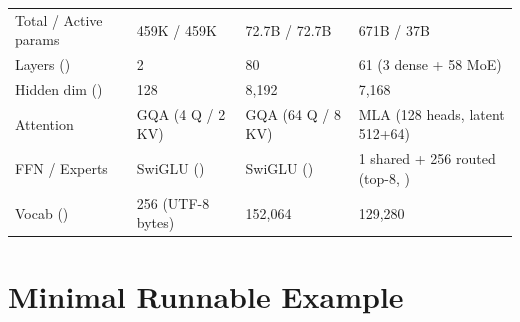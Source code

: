 \par\vspace{4pt}\noindent\begin{minipage}{\linewidth}
\small
\begin{tabularx}{\linewidth}{@{}l Y Y Y@{}}
\toprule
{} &  &  &  \\
\midrule
Total / Active params & 459K / 459K & 72.7B / 72.7B & 671B / 37B \\
Layers () & 2 & 80 & 61 (3 dense + 58 MoE) \\
Hidden dim () & 128 & 8,192 & 7,168 \\
Attention & GQA (4 Q / 2 KV) & GQA (64 Q / 8 KV) & MLA (128 heads, latent 512+64) \\
FFN / Experts & SwiGLU () & SwiGLU () & 1 shared + 256 routed (top-8, ) \\
Vocab () & 256 (UTF-8 bytes) & 152,064 & 129,280 \\
\bottomrule
\end{tabularx}
\end{minipage}\par\vspace{4pt}

\section{Minimal Runnable Example}


